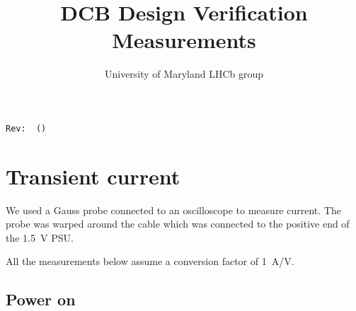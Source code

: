 \documentclass[11pt,letterpaper]{refart}
\title{DCB Design Verification Measurements}
\author{University of Maryland LHCb group}
\begin{document}
\maketitle
\hfill\small{\texttt{Rev:~\gitRel~(\gitAbbrevHash)}}
\tableofcontents


\section{Transient current}
We used a Gauss probe connected to an oscilloscope to measure current.
The probe was warped around the cable which was connected to the positive end of
the \SI{1.5}{\volt} PSU.

All the measurements below assume a conversion factor of \SI{1}{\ampere/\volt}.

\subsection{Power on}
\begin{figure}[ht]
    \centering
    \begin{subfigure}{0.8\linewidth}
    \end{subfigure}
\end{figure}
\end{document}
